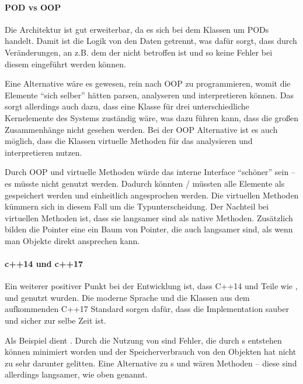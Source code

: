     \paragraph{POD vs OOP}
      Die Architektur ist gut erweiterbar, da es sich bei dem  Klassen um PODs handelt. Damit ist die Logik von den Daten getrennt, was dafür sorgt, dass durch Veränderungen, an z.B. dem  der  nicht betroffen ist und so keine Fehler bei diesem eingeführt werden können.

      Eine Alternative wäre es gewesen, rein nach OOP zu programmieren, womit die  Elemente ``sich selber'' hätten parsen, analyseren und interpretieren können. Das sorgt allerdings auch dazu, dass eine Klasse für drei unterschiedliche Kernelemente des Systems zuständig wäre, was dazu führen kann, dass die großen Zusammenhänge nicht gesehen werden. Bei der OOP Alternative ist es auch möglich, dass die Klassen virtuelle Methoden für das analysieren und interpretieren nutzen.

      Durch OOP und virtuelle Methoden würde das interne Interface ``schöner'' sein -- es müsste nicht  genutzt werden. Dadurch könnten / müssten alle Elemente als  gespeichert werden und einheitlich angesprochen werden. Die virtuellen Methoden kümmern sich in diesem Fall um die Typunterscheidung. Der Nachteil bei virtuellen Methoden ist, dass sie langsamer sind als native Methoden. Zusätzlich bilden die Pointer eine ein Baum von Pointer, die auch langsamer sind, als wenn man Objekte direkt ansprechen kann.

    \paragraph{c++14 und c++17}
      Ein weiterer positiver Punkt bei der Entwicklung ist, dass C++14 und Teile wie  \autocite{any-lib},  und  \autocite{variant-lib} genutzt wurden. Die moderne Sprache und die Klassen aus dem aufkommenden C++17 Standard sorgen dafür, dass die Implementation sauber und sicher zur selbe Zeit ist.

      Als Beispiel dient . Durch die Nutzung von  sind Fehler, die durch s entstehen können minimiert worden und der Speicherverbrauch von den Objekten hat nicht zu sehr darunter gelitten. Eine Alternative zu s und  wären  Methoden -- diese sind allerdings langsamer, wie oben genannt.

